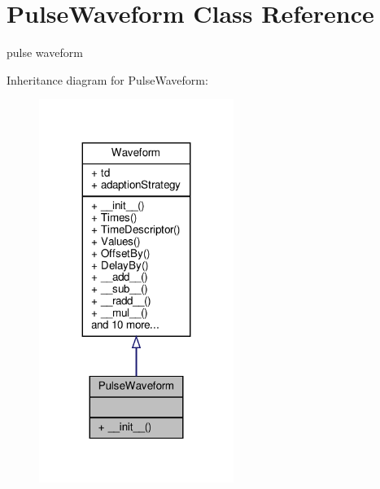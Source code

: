 \hypertarget{classSignalIntegrity_1_1TimeDomain_1_1Waveform_1_1PulseWaveform_1_1PulseWaveform}{}\section{Pulse\+Waveform Class Reference}
\label{classSignalIntegrity_1_1TimeDomain_1_1Waveform_1_1PulseWaveform_1_1PulseWaveform}


pulse waveform  




Inheritance diagram for Pulse\+Waveform\+:\nopagebreak
\begin{figure}[H]
\begin{center}
\leavevmode
\includegraphics[width=179pt]{classSignalIntegrity_1_1TimeDomain_1_1Waveform_1_1PulseWaveform_1_1PulseWaveform__inherit__graph}
\end{center}
\end{figure}


